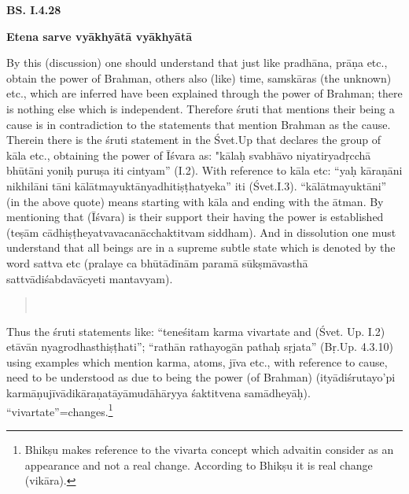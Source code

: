 \textbf{BS. I.4.28}

\textbf{Etena sarve vyākhyātā vyākhyātā}

By this (discussion) one should understand that just like pradhāna, prāṇa etc., obtain the power of Brahman, others also (like) time,  samskāras (the unknown) etc., which are inferred have been explained through the power of Brahman; there is nothing else which is independent. Therefore śruti that mentions their being a cause is in contradiction to the statements that mention Brahman as the cause. Therein there is the śruti statement in the Śvet.Up that declares the group of kāla etc., obtaining the power of Īśvara as: "kālaḥ svabhāvo niyatiryadṛcchā bhūtāni yoniḥ puruṣa iti cintyam” (I.2).  With reference to kāla etc: “yaḥ kāraṇāni nikhilāni tāni kālātmayuktānyadhitiṣṭhatyeka” iti (Śvet.I.3). “kālātmayuktāni” (in the above quote) means starting with kāla and ending with the ātman. By mentioning that (Īśvara) is their support their having the power is established (teṣām cādhiṣṭheyatvavacanācchaktitvam siddham). And in dissolution one must understand that all beings are in a supreme subtle state which is denoted by the word sattva etc (pralaye ca bhūtādīnām paramā sūkṣmāvasthā sattvādiśabdavācyeti mantavyam).

\eject



\begin{verse}
\\
\end{verse}



Thus the śruti statements like: “teneśitam karma vivartate and (Śvet. Up. I.2) etāvān nyagrodhasthiṣṭhati”; “rathān rathayogān pathaḥ sṛjata” (Bṛ.Up. 4.3.10) using examples which mention karma, atoms, jīva etc., with reference to cause, need to be understood as due to being the power (of Brahman) (ityādiśrutayo’pi karmāṇujīvādikāraṇatāyāmudāhāryya śaktitvena samādheyāḥ). “vivartate”=changes.\footnote{Bhikṣu makes reference to the vivarta concept which advaitin consider as an appearance and not a real change. According to Bhikṣu it is real change (vikāra).} 

